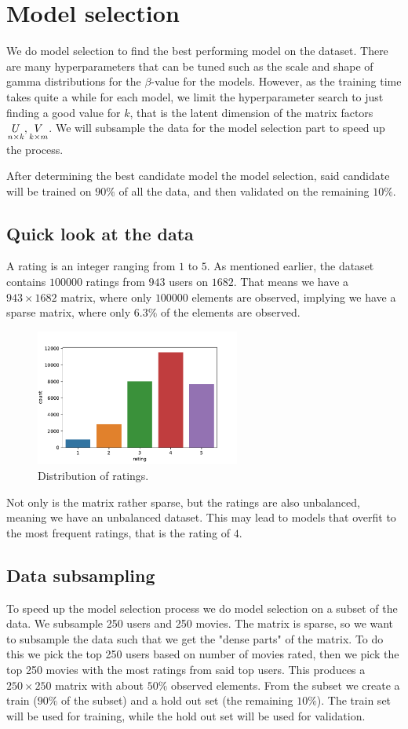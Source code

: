 \documentclass[12pt]{article}
\begin{document}
\section{Model selection}
We do model selection to find the best performing model on the dataset. There are many hyperparameters that can be tuned such as the scale and shape of gamma distributions for the $\beta$-value for the models. However, as the training time takes quite a while for each model, we limit the hyperparameter search to just finding a good value for $k$, that is the latent dimension of the matrix factors $\underset{n \times k}{U}, \underset{k \times m}{V}$. We will subsample the data for the model selection part to speed up the process.

After determining the best candidate model the model selection, said candidate will be trained on $90\%$ of all the data, and then validated on the remaining $10\%$.

    \subsection*{Quick look at the data}
    A rating is an integer ranging from $1$ to $5$. As mentioned earlier, the dataset contains $100 000$ ratings from $943$ users on $1682$. That means we have a $943 \times 1682$ matrix, where only $100000$ elements are observed, implying we have a sparse matrix, where only $6.3\%$ of the elements are observed.  
    \begin{figure}[H]
        \centering
        \caption{Distribution of ratings.}
        \includegraphics[width=0.6\textwidth]{ratings.pdf}
    \end{figure}
    Not only is the matrix rather sparse, but the ratings are also unbalanced, meaning we have an unbalanced dataset. This may lead to models that overfit to the most frequent ratings, that is the rating of $4$.  

    \subsection{Data subsampling}
    To speed up the model selection process we do model selection on a subset of the data. We subsample 250 users and 250 movies. The matrix is sparse, so we want to subsample the data such that we get the "dense parts" of the matrix. To do this we pick the top 250 users based on number of movies rated, then we pick the top 250 movies with the most ratings from said top users. This produces a $250 \times 250$ matrix with about $50\%$ observed elements. From the subset we create a train ($90\%$ of the subset) and a hold out set (the remaining $10\%$). The train set will be used for training, while the hold out set will be used for validation.
\end{document}
